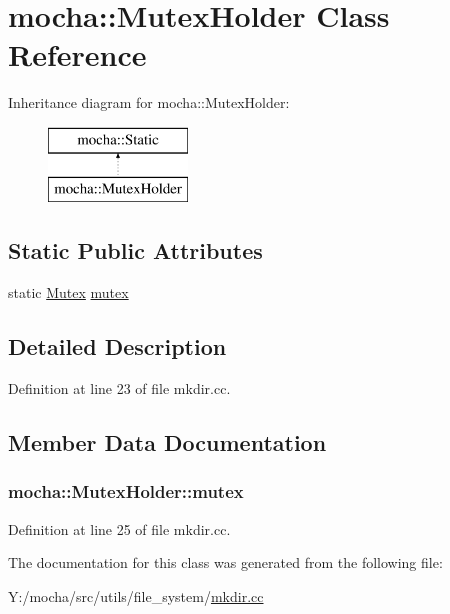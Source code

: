 \hypertarget{classmocha_1_1_mutex_holder}{
\section{mocha::MutexHolder Class Reference}
\label{classmocha_1_1_mutex_holder}
}
Inheritance diagram for mocha::MutexHolder:\begin{figure}[H]
\begin{center}
\leavevmode
\includegraphics[height=2.000000cm]{classmocha_1_1_mutex_holder}
\end{center}
\end{figure}
\subsection*{Static Public Attributes}
\begin{DoxyCompactItemize}
\item 
static \hyperlink{classmocha_1_1_mutex}{Mutex} \hyperlink{classmocha_1_1_mutex_holder_a9cb7a4ecb0e6510b1f83d4bcf337053a}{mutex}
\end{DoxyCompactItemize}


\subsection{Detailed Description}


Definition at line 23 of file mkdir.cc.



\subsection{Member Data Documentation}
\hypertarget{classmocha_1_1_mutex_holder_a9cb7a4ecb0e6510b1f83d4bcf337053a}{
\subsubsection[{mutex}]{ {\bf mocha::MutexHolder::mutex}}}
\label{classmocha_1_1_mutex_holder_a9cb7a4ecb0e6510b1f83d4bcf337053a}


Definition at line 25 of file mkdir.cc.



The documentation for this class was generated from the following file:\begin{DoxyCompactItemize}
\item 
Y:/mocha/src/utils/file\_\-system/\hyperlink{mkdir_8cc}{mkdir.cc}\end{DoxyCompactItemize}
